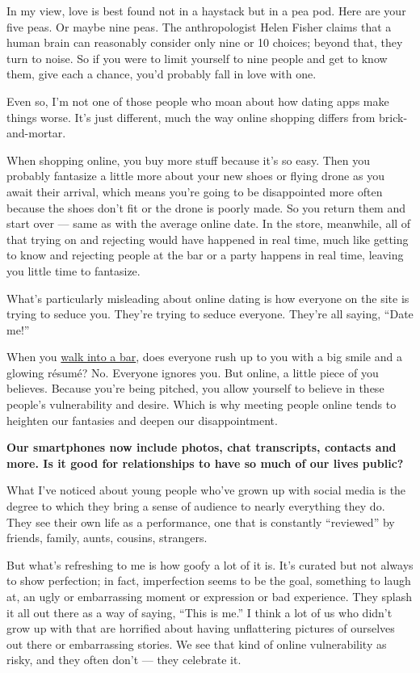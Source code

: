 In my view, love is best found not in a haystack but in a pea pod. Here
are your five peas. Or maybe nine peas. The anthropologist Helen Fisher
claims that a human brain can reasonably consider only nine or 10
choices; beyond that, they turn to noise. So if you were to limit
yourself to nine people and get to know them, give each a chance, you'd
probably fall in love with one.

Even so, I'm not one of those people who moan about how dating apps make
things worse. It's just different, much the way online shopping differs
from brick-and-mortar.

When shopping online, you buy more stuff because it's so easy. Then you
probably fantasize a little more about your new shoes or flying drone as
you await their arrival, which means you're going to be disappointed
more often because the shoes don't fit or the drone is poorly made. So
you return them and start over --- same as with the average online date.
In the store, meanwhile, all of that trying on and rejecting would have
happened in real time, much like getting to know and rejecting people at
the bar or a party happens in real time, leaving you little time to
fantasize.

What's particularly misleading about online dating is how everyone on
the site is trying to seduce you. They're trying to seduce everyone.
They're all saying, ``Date me!''

When you
\href{http://www.nytimes3xbfgragh.onion/2012/08/22/technology/the-new-high-tech-dating-technology-meet-in-a-bar.html}{walk
into a bar}, does everyone rush up to you with a big smile and a glowing
résumé? No. Everyone ignores you. But online, a little piece of you
believes. Because you're being pitched, you allow yourself to believe in
these people's vulnerability and desire. Which is why meeting people
online tends to heighten our fantasies and deepen our disappointment.

\textbf{Our smartphones now include photos, chat transcripts, contacts
and more. Is it good for relationships to have so much of our lives
public?}

What I've noticed about young people who've grown up with social media
is the degree to which they bring a sense of audience to nearly
everything they do. They see their own life as a performance, one that
is constantly ``reviewed'' by friends, family, aunts, cousins,
strangers.

But what's refreshing to me is how goofy a lot of it is. It's curated
but not always to show perfection; in fact, imperfection seems to be the
goal, something to laugh at, an ugly or embarrassing moment or
expression or bad experience. They splash it all out there as a way of
saying, ``This is me.'' I think a lot of us who didn't grow up with that
are horrified about having unflattering pictures of ourselves out there
or embarrassing stories. We see that kind of online vulnerability as
risky, and they often don't --- they celebrate it.

